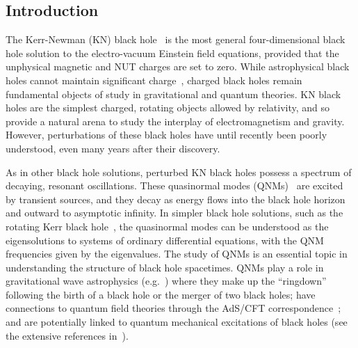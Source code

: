 \begin{refsection}
\section{Introduction}

The Kerr-Newman (KN) black hole~\cite{Newman:1965my,Adamo:2014baa,Chrusciel:2012jk} is the most general four-dimensional black hole solution to the electro-vacuum Einstein field equations, provided that the unphysical magnetic and NUT charges are set to zero. 
While astrophysical black holes cannot maintain significant charge~\cite{Gibbons1974,Blandford:1977ds}, charged black holes remain fundamental objects of study in gravitational and quantum theories. 
KN black holes are the simplest charged, rotating objects allowed by relativity, and so provide a natural arena to study the interplay of electromagnetism and gravity. 
However, perturbations of these black holes have until recently been poorly understood, even many years after their discovery.

As in other black hole solutions, perturbed KN black holes possess a spectrum of decaying, resonant oscillations. 
These quasinormal modes (QNMs)~\cite{Kokkotas1999,Berti2009} are excited by transient sources, and they decay as energy flows into the black hole horizon and outward to asymptotic infinity. 
In simpler black hole solutions, such as the rotating Kerr black hole~\cite{Kerr:1963ud,Teukolsky:2014vca}, the quasinormal modes can be understood as the eigensolutions to systems of ordinary differential equations, with the QNM frequencies given by the eigenvalues. 
The study of QNMs is an essential topic in understanding the structure of black hole spacetimes. 
QNMs play a role in gravitational wave astrophysics (e.g.~\cite{Dreyer2004,Berti:2005ys,Barausse:2014tra}) where they make up the ``ringdown'' following the birth of a black hole or the merger of two black holes; have connections to quantum field theories through the AdS/CFT correspondence~\cite{Son:2007vk}; and are potentially linked to quantum mechanical excitations of black holes (see the extensive references in~\cite{Berti2009}).


\end{refsection}
